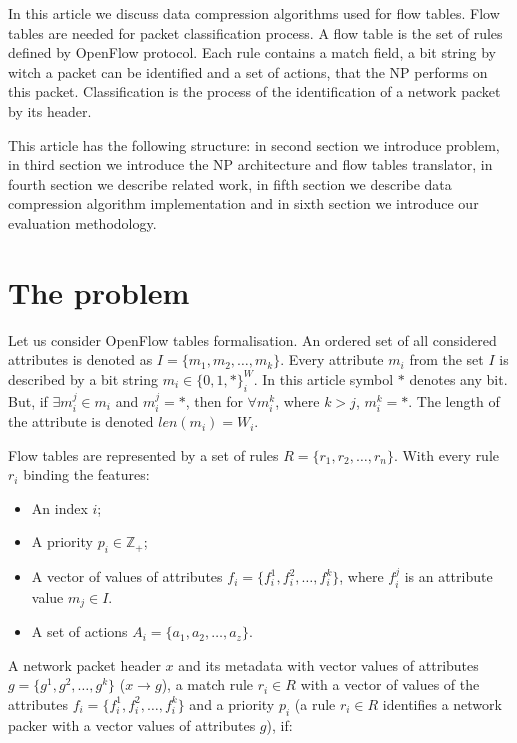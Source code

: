 \documentclass[conference]{IEEEtran}
\begin{document}
        In this article we discuss data compression algorithms used for flow tables. 
        Flow tables are needed for packet classification process. A flow table is the set of rules defined
        by OpenFlow protocol. Each rule contains a match field, a bit string by witch a packet can be identified 
        and a set of actions, that the NP performs on this packet.
        Classification is the process of the identification of a network packet by its header. 
    
        This article has the following structure: in second section we introduce problem, in third section we introduce
        the NP architecture and flow tables translator, in fourth section we describe related work, in fifth section 
        we describe data compression algorithm implementation and in sixth section we introduce our evaluation methodology. 
    
    \section{The problem}
    \label{sect:problem}
        Let us consider OpenFlow tables formalisation. An ordered set of all considered attributes is denoted as \(I=\{m_1,m_2,\ldots,m_k\}\). 
        Every attribute \(m_i\) from the set \(I\) is described by a bit string \(m_i \in \{0, 1, *\}^W_i\).
        In this article symbol \(*\) denotes any bit. But, if \(\exists m_i^j \in m_i\) and  \( m_i^j = *\), 
        then for \( \forall m_i^k \), where \(k > j\), \( m_i^k = *\). The length of the attribute is denoted \(len(m_i) = W_i\).

        Flow tables are represented by a set of rules \(R=\{r_1,r_2,\ldots,r_n\}\). With every rule \(r_i\) binding the features:
        \begin{itemize}
            \item An index \(i\);
            \item A priority \(p_i \in \mathbb{Z}_+\);
            \item A vector of values of attributes \(f_i=\{f_i^1,f_i^2,\ldots,f_i^k\}\), where \(f_i^j\) is an attribute value \(m_j\in I\). %
            \item A set of actions \(A_i = \{a_1, a_2, \ldots, a_z\} \).
        \end{itemize}

        A network packet header \(x\) and its metadata with vector values of attributes \(g=\{g^1,g^2,\ldots,g^k\}\) (\(x \rightarrow g\)),
        a match rule \(r_i\in R\) with a vector of values of the attributes \(f_i=\{f_i^1,f_i^2,\ldots,f_i^k\}\) 
        and a priority \(p_i\) (a rule \(r_i\in R\) identifies a network packer with a vector values of attributes \(g\)), if:
\end{document}
